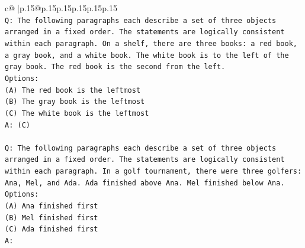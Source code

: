 \documentclass{article}
\begin{document}
{\begin{supertabular}{c@{$\;$}|p{.15\linewidth}@{}p{.15\linewidth}p{.15\linewidth}p{.15\linewidth}p{.15\linewidth}p{.15\linewidth}}
{{{\\ 
\texttt{Q: The following paragraphs each describe a set of three objects arranged in a fixed order. The statements are logically consistent within each paragraph. On a shelf, there are three books: a red book, a gray book, and a white book. The white book is to the left of the gray book. The red book is the second from the left.} \\
\texttt{Options:} \\
\texttt{(A) The red book is the leftmost} \\
\texttt{(B) The gray book is the leftmost} \\
\texttt{(C) The white book is the leftmost} \\
\texttt{A: (C)} \\
\\ 
\texttt{Q: The following paragraphs each describe a set of three objects arranged in a fixed order. The statements are logically consistent within each paragraph. In a golf tournament, there were three golfers: Ana, Mel, and Ada. Ada finished above Ana. Mel finished below Ana.} \\
\texttt{Options:} \\
\texttt{(A) Ana finished first} \\
\texttt{(B) Mel finished first} \\
\texttt{(C) Ada finished first} \\
\texttt{A:} \\
            }
        }
    }
     \\ \\


\end{supertabular}}
\end{document}
